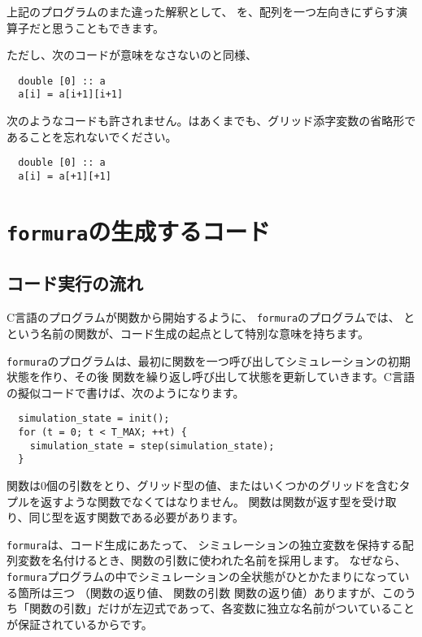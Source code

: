 \documentclass{jsarticle}
\newcommand{\formura}{{\texttt{formura}}}
\begin{document}
上記のプログラムのまた違った解釈として、
\lit{[+1]}を、配列を一つ左向きにずらす演算子だと思うこともできます。

ただし、次のコードが意味をなさないのと同様、

\begin{lstlisting}
  double [0] :: a
  a[i] = a[i+1][i+1]
\end{lstlisting}

次のようなコードも許されません。\lit{[+1]}はあくまでも、グリッド添字変数の省略形であることを忘れないでください。

\begin{lstlisting}
  double [0] :: a
  a[i] = a[+1][+1]
\end{lstlisting}


\newpage

\section{\formura の生成するコード}\label{sec:formura-generated-code}

\subsection{コード実行の流れ}

C言語のプログラムが関数から開始するように、
\formura のプログラムでは、
と
という名前の関数が、コード生成の起点として特別な意味を持ちます。

\formura のプログラムは、最初に関数を一つ呼び出してシミュレーションの初期状態を作り、その後
関数を繰り返し呼び出して状態を更新していきます。C言語の擬似コードで書けば、次のようになります。

\begin{screen}
\begin{verbatim}
  simulation_state = init();
  for (t = 0; t < T_MAX; ++t) {
    simulation_state = step(simulation_state);
  }
\end{verbatim}
\end{screen}


関数は0個の引数をとり、グリッド型の値、またはいくつかのグリッドを含むタプルを返すような関数でなくてはなりません。
関数は関数が返す型を受け取り、同じ型を返す関数である必要があります。

\formura は、コード生成にあたって、
シミュレーションの独立変数を保持する配列変数を名付けるとき、関数の引数に使われた名前を採用します。
なぜなら、\formura プログラムの中でシミュレーションの全状態がひとかたまりになっている箇所は三つ
（関数の返り値、
関数の引数
関数の返り値）ありますが、このうち「関数の引数」だけが左辺式であって、各変数に独立な名前がついていることが保証されているからです。
\end{document}
